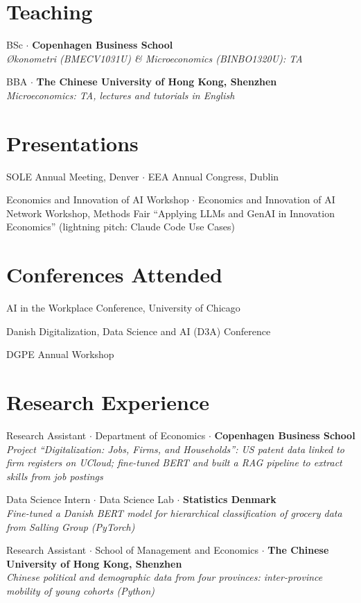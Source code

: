 \documentclass[11pt,a4paper]{article}
\newenvironment{dated}{%
  \begin{list}{}{%
    \setlength{\leftmargin}{2.75cm}\setlength{\labelwidth}{2.5cm}%
    \setlength{\labelsep}{0.25cm}\setlength{\itemsep}{1pt}%
    \setlength{\parsep}{0pt}\setlength{\topsep}{0pt}\setlength{\listparindent}{0pt}}%
}{\end{list}}
\newcommand{\entry}[2]{\item[{\makebox[2.5cm][l]{#1}}]#2}
\newcommand{\sub}[1]{\\ {\itshape #1}}
\newcommand{\sep}{ $\cdot$ }
\begin{document}
\section{Teaching}
\begin{dated}
  \entry{Fall 2024}{BSc\sep\textbf{Copenhagen Business School}
    \sub{\O konometri (BMECV1031U) \& Microeconomics (BINBO1320U): TA}}
  \entry{May-Jul 2021}{BBA\sep\textbf{The Chinese University of Hong Kong, Shenzhen}
    \sub{Microeconomics: TA, lectures and tutorials in English}}
\end{dated}

\section{Presentations}
\begin{dated}
  \entry{2026}{SOLE Annual Meeting, Denver\sep EEA Annual Congress, Dublin}
  \entry{2025}{Economics and Innovation of AI Workshop\sep Economics and Innovation of AI Network Workshop, Methods Fair ``Applying LLMs and GenAI in Innovation Economics'' (lightning pitch: Claude Code Use Cases)}
\end{dated}

\section{Conferences Attended}
\begin{dated}
  \entry{2026}{AI in the Workplace Conference, University of Chicago}
  \entry{2024}{Danish Digitalization, Data Science and AI (D3A) Conference}
  \entry{2023}{DGPE Annual Workshop}
\end{dated}

\section{Research Experience}
\begin{dated}
  \entry{2022-2024}{Research Assistant\sep Department of Economics\sep\textbf{Copenhagen Business School}
    \sub{Project ``Digitalization: Jobs, Firms, and Households'': US patent data linked to firm registers on UCloud; fine-tuned BERT and built a RAG pipeline to extract skills from job postings}}
  \entry{Jun-Aug 2023}{Data Science Intern\sep Data Science Lab\sep\textbf{Statistics Denmark}
    \sub{Fine-tuned a Danish BERT model for hierarchical classification of grocery data from Salling Group (PyTorch)}}
  \entry{May-Jul 2021}{Research Assistant\sep School of Management and Economics\sep\textbf{The Chinese University of Hong Kong, Shenzhen}
    \sub{Chinese political and demographic data from four provinces: inter-province mobility of young cohorts (Python)}}
\end{dated}
\end{document}

